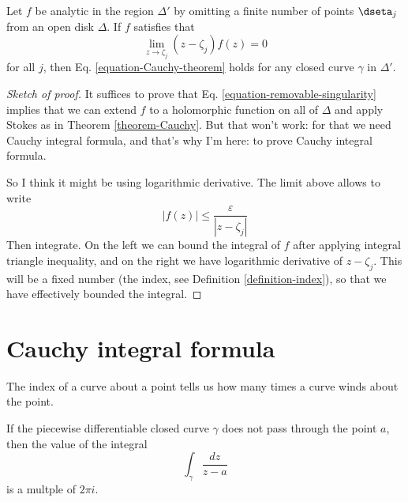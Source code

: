 \begin{theorem}
\label{theorem-Cauchy-removable}
Let $f$ be analytic in the region $\Delta'$ by omitting a finite number of
points $\dseta_j$ from an open disk $\Delta$. If $f$ satisfies that
\begin{equation}
\label{equation-removable-singularity}
\lim_{z\to\zeta_j} (z-\zeta_j)f(z)=0
\end{equation}
for all $j$, then Eq. \ref{equation-Cauchy-theorem} holds for any closed curve
$\gamma$ in $\Delta'$.
\end{theorem}

\begin{proof}[Sketch of proof]
It suffices to prove that Eq. \ref{equation-removable-singularity} implies that
we can extend $f$ to a holomorphic function on all of $\Delta$ and apply Stokes
as in Theorem \ref{theorem-Cauchy}. But that won't work: for that we need Cauchy
integral formula, and that's why I'm here: to prove Cauchy integral formula.

So I think it might be using logarithmic derivative. The limit above allows to
write
$$
|f(z)|\leq \frac{\varepsilon}{|z-\zeta_j|}
$$
Then integrate. On the left we can bound the integral of $f$ after applying
integral triangle inequality, and on the right we have logarithmic derivative of
$z-\zeta_j$. This will be a fixed number (the index, see Definition
\ref{definition-index}), so that we have effectively bounded the integral.
\end{proof}

\section{Cauchy integral formula}
\label{section-Cauchy-integral-formula}

\begin{slogan}
The index of a curve about a point tells us how many times a curve winds about 
the point.
\end{slogan}

\begin{lemma}
\label{lemma-index-is-multiple-of-2pii}
\begin{reference}
\cite[Section 2.2, Lemma 1]{ahl}
\end{reference}
If the piecewise differentiable closed curve $\gamma$ does not pass through the
point $a$, then the value of the integral
$$
\int_\gamma\frac{dz}{z-a}
$$
is a multple of $2\pi i$.
\end{lemma}


